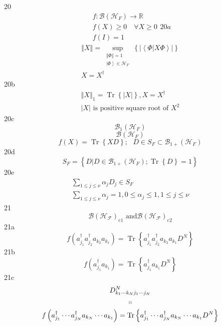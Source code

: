 \documentclass[aps,preprint]{revtex4}%
\begin{document}
20
\begin{subequations}
\label{States}%
\begin{gather*}
f:\mathcal{B}\left(  \mathcal{H}_{F}\right)  \rightarrow\mathbb{R}\\
f\left(  X\right)  \geq0\quad\forall X\geq0\\
f\left(  I\right)  =1
\end{gather*}
20a%
\end{subequations}
\begin{gather*}
\left\Vert X\right\Vert =\sup_{\substack{\left\Vert \Phi\right\Vert
=1\\\left\vert \Phi\right\rangle \in\mathcal{H}_{F}}}\left\{  \left\vert
\left\langle \left.  \Phi\right\vert X\Phi\right\rangle \right\vert \right\}
\\
X=X^{\dagger}%
\end{gather*}
20b%
\begin{gather*}
\left\Vert X\right\Vert _{1}=\operatorname{Tr}\left\{  \left\vert X\right\vert
\right\}  ,X=X^{\dagger}\\
\left\vert X\right\vert \text{ is positive square root of }X^{2}%
\end{gather*}
20c%
\[
\mathcal{B}_{1}\left(  \mathcal{H}_{F}\right)
\]%
\[
\mathcal{B}\left(  \mathcal{H}_{F}\right)
\]%
\[
f\left(  X\right)  =\operatorname{Tr}\left\{  XD\right\}  ;\text{ }D\in
S_{F}\subset\mathcal{B}_{1+}\left(  \mathcal{H}_{F}\right)
\]
20d%
\[
S_{F}=\left\{  \left.  D\right\vert D\in\mathcal{B}_{1+}\left(  \mathcal{H}%
_{F}\right)  ;\operatorname{Tr}\left\{  D\right\}  =1\right\}
\]
20e%
\begin{gather*}
\sum_{1\leq j\leq\nu}\alpha_{j}D_{j}\in S_{F}\\
\sum_{1\leq j\leq\nu}\alpha_{j}=1,0\leq\alpha_{j}\leq1,1\leq j\leq\nu
\end{gather*}
21%
\[
\mathcal{B}\left(  \mathcal{H}_{\mathcal{F}}\right)  _{e1}\text{ and
}\mathcal{B}\left(  \mathcal{H}_{\mathcal{F}}\right)  _{e2}%
\]
21a%
\[
f\left(  a_{j_{1}}^{\dagger}a_{j_{2}}^{\dagger}a_{k_{2}}a_{k_{1}}\right)
=\operatorname{Tr}\left\{  a_{j_{1}}^{\dagger}a_{j_{2}}^{\dagger}a_{k_{2}%
}a_{k_{1}}D^{N}\right\}
\]
21b%
\[
f\left(  a_{j_{1}}^{\dagger}a_{k_{1}}\right)  =\operatorname{Tr}\left\{
a_{j_{1}}^{\dagger}a_{k_{1}}D^{N}\right\}
\]
21c%
\begin{gather*}
D_{k_{1}\cdots k_{N}j_{1}\cdots j_{N}}^{N}\\
\shortparallel\\
f\left(  a_{j_{1}}^{\dagger}\cdots a_{j_{N}}^{\dagger}a_{k_{N}}\cdots
a_{k_{1}}\right)  =\operatorname{Tr}\left\{  a_{j_{1}}^{\dagger}\cdots
a_{j_{N}}^{\dagger}a_{k_{N}}\cdots a_{k_{1}}D^{N}\right\}
\end{gather*}
\end{document}
